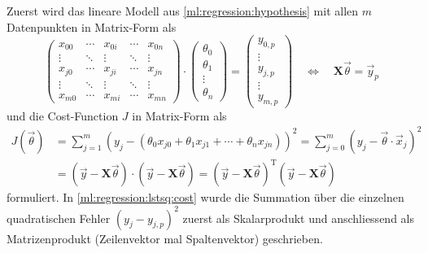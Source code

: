 Zuerst wird das lineare Modell aus \eqref{ml:regression:hypothesis} mit allen
$m$ Datenpunkten in Matrix-Form als
\begin{equation}
    \begin{pmatrix}
        x_{00}& \cdots& x_{0i}& \cdots& x_{0n}\\
        \vdots& \ddots& \vdots& \ddots& \vdots\\
        x_{j0}& \cdots& x_{ji}& \cdots& x_{jn}\\
        \vdots& \ddots& \vdots& \ddots& \vdots\\
        x_{m0}& \cdots& x_{mi}& \cdots& x_{mn}
    \end{pmatrix}
    \cdot
    \begin{pmatrix}
        \theta_0\\ \theta_1 \\ \vdots\\ \theta_n
    \end{pmatrix}
    = \begin{pmatrix}
        y_{0,p}\\ \vdots \\ y_{j,p} \\ \vdots \\ y_{m,p}
    \end{pmatrix}
    \quad \iff \quad
    \mathbf{X} \vec \theta = \vec y_p
    \label{ml:regression:lstsq:modell}
\end{equation}
und die Cost-Function $J$ in Matrix-Form als
\begin{align}
    J(\vec \theta) &= \sum_{j=1}^m \left(y_j - (\theta_0 x_{j0} + \theta_1 x_{j1} + \cdots + \theta_n x_{jn}) \right)^2
    = \sum_{j=0}^{m} \left( y_j - \vec \theta \cdot \vec x_j \right)^2 \nonumber\\
    &= \left(\vec y - \mathbf{X} \vec \theta\right) \cdot \left(\vec y - \mathbf{X} \vec \theta\right)
    = \left(\vec y - \mathbf{X} \vec \theta\right)^\mathrm{T} \left(\vec y - \mathbf{X} \vec \theta\right)
    \label{ml:regression:lstsq:cost}
\end{align}
formuliert. In \eqref{ml:regression:lstsq:cost} wurde die Summation über die
einzelnen quadratischen Fehler $(y_j - y_{j,p})^2$ zuerst als Skalarprodukt und
anschliessend als Matrizenprodukt (Zeilenvektor mal Spaltenvektor) geschrieben.

